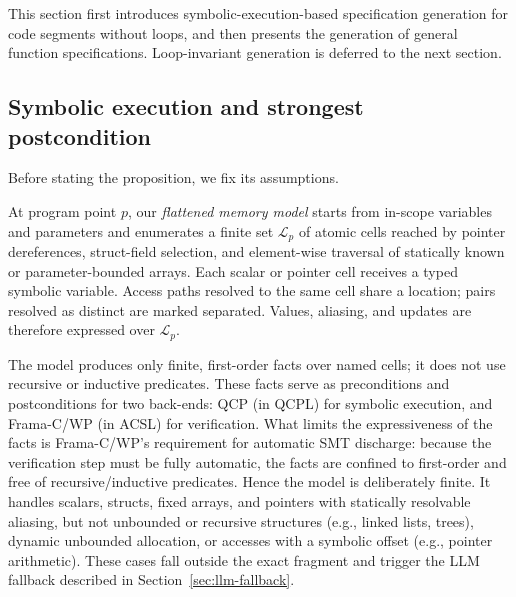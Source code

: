 This section first introduces symbolic-execution-based specification generation for code segments without loops, and then presents the generation of general function specifications. Loop-invariant generation is deferred to the next section.

\subsection{Symbolic execution and strongest postcondition} %
Before stating the proposition, we fix its assumptions. 


At program point $p$, our \emph{flattened memory model} starts from in-scope variables and parameters and enumerates a finite set $\mathcal{L}_p$ of atomic cells reached by pointer dereferences, struct-field selection, and element-wise traversal of statically known or parameter-bounded arrays. Each scalar or pointer cell receives a typed symbolic variable. Access paths resolved to the same cell share a location; pairs resolved as distinct are marked separated. Values, aliasing, and updates are therefore expressed over $\mathcal{L}_p$.

The model produces only finite, first-order facts over named cells; it does not use recursive or inductive predicates. These facts serve as preconditions and postconditions for two back-ends: QCP (in QCPL) for symbolic execution, and Frama-C/WP (in ACSL) for verification. What limits the expressiveness of the facts is Frama-C/WP's requirement for automatic SMT discharge: because the verification step must be fully automatic, the facts are confined to first-order and free of recursive/inductive predicates. Hence the model is deliberately finite. It handles scalars, structs, fixed arrays, and pointers with statically resolvable aliasing, but not unbounded or recursive structures (e.g., linked lists, trees), dynamic unbounded allocation, or accesses with a symbolic offset (e.g., pointer arithmetic). These cases fall outside the exact fragment and trigger the LLM fallback described in Section~\ref{sec:llm-fallback}.






